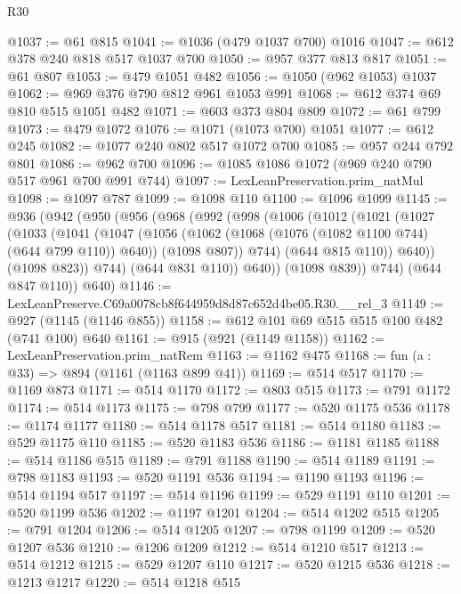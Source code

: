 \begin{lexlean}{R30}
\begin{coremodule}
@1037 := @61 @815
@1041 := @1036 (@479 @1037 @700) @1016
@1047 := @612 @378 @240 @818 @517 @1037 @700
@1050 := @957 @377 @813 @817
@1051 := @61 @807
@1053 := @479 @1051 @482
@1056 := @1050 (@962 @1053) @1037
@1062 := @969 @376 @790 @812 @961 @1053 @991
@1068 := @612 @374 @69 @810 @515 @1051 @482
@1071 := @603 @373 @804 @809
@1072 := @61 @799
@1073 := @479 @1072
@1076 := @1071 (@1073 @700) @1051
@1077 := @612 @245
@1082 := @1077 @240 @802 @517 @1072 @700
@1085 := @957 @244 @792 @801
@1086 := @962 @700
@1096 := @1085 @1086 @1072 (@969 @240 @790 @517 @961 @700 @991 @744)
@1097 := LexLeanPreservation.prim_natMul
@1098 := @1097 @787
@1099 := @1098 @110
@1100 := @1096 @1099
@1145 := @936
    (@942
      (@950
        (@956
          (@968
            (@992
              (@998
                (@1006
                  (@1012
                    (@1021
                      (@1027
                        (@1033
                          (@1041
                            (@1047
                              (@1056
                                (@1062 (@1068 (@1076 (@1082 @1100 @744) (@644 @799 @110)) @640))
                                (@1098 @807))
                              @744)
                            (@644 @815 @110))
                          @640))
                      (@1098 @823))
                    @744)
                  (@644 @831 @110))
                @640))
            (@1098 @839))
          @744)
        (@644 @847 @110))
      @640)
@1146 := LexLeanPreserve.C69a0078cb8f644959d8d87c652d4be05.R30.__rel_3
@1149 := @927 (@1145 (@1146 @855))
@1158 := @612 @101 @69 @515 @515 @100 @482 (@741 @100) @640
@1161 := @915 (@921 (@1149 @1158))
@1162 := LexLeanPreservation.prim_natRem
@1163 := @1162 @475
@1168 := fun (a : @33) => @894 (@1161 (@1163 @899 @41))
@1169 := @514 @517
@1170 := @1169 @873
@1171 := @514 @1170
@1172 := @803 @515
@1173 := @791 @1172
@1174 := @514 @1173
@1175 := @798 @799
@1177 := @520 @1175 @536
@1178 := @1174 @1177
@1180 := @514 @1178 @517
@1181 := @514 @1180
@1183 := @529 @1175 @110
@1185 := @520 @1183 @536
@1186 := @1181 @1185
@1188 := @514 @1186 @515
@1189 := @791 @1188
@1190 := @514 @1189
@1191 := @798 @1183
@1193 := @520 @1191 @536
@1194 := @1190 @1193
@1196 := @514 @1194 @517
@1197 := @514 @1196
@1199 := @529 @1191 @110
@1201 := @520 @1199 @536
@1202 := @1197 @1201
@1204 := @514 @1202 @515
@1205 := @791 @1204
@1206 := @514 @1205
@1207 := @798 @1199
@1209 := @520 @1207 @536
@1210 := @1206 @1209
@1212 := @514 @1210 @517
@1213 := @514 @1212
@1215 := @529 @1207 @110
@1217 := @520 @1215 @536
@1218 := @1213 @1217
@1220 := @514 @1218 @515

\end{coremodule}
\end{lexlean}
